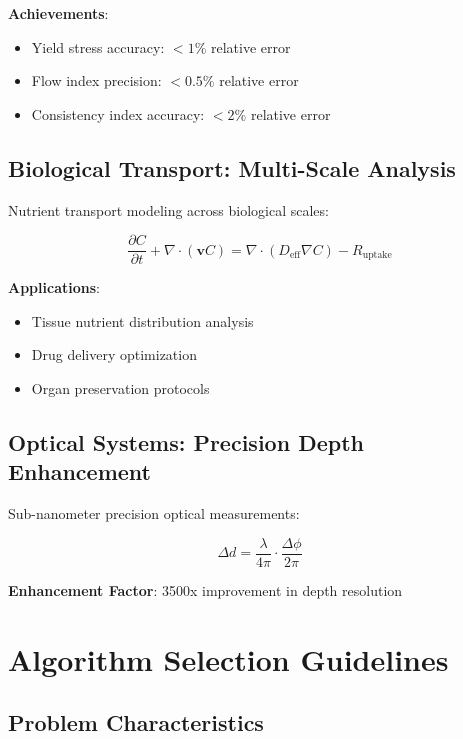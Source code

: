 \documentclass[11pt,a4paper]{article}
\begin{document}
\textbf{Achievements}:
\begin{itemize}
    \item Yield stress accuracy: $< 1\%$ relative error
    \item Flow index precision: $< 0.5\%$ relative error
    \item Consistency index accuracy: $< 2\%$ relative error
\end{itemize}

\subsection{Biological Transport: Multi-Scale Analysis}
\label{subsec:biological}

Nutrient transport modeling across biological scales:

\begin{equation}
\frac{\partial C}{\partial t} + \nabla \cdot (\mathbf{v}C) = \nabla \cdot (D_{\text{eff}} \nabla C) - R_{\text{uptake}}
\label{eq:advection_diffusion}
\end{equation}

\textbf{Applications}:
\begin{itemize}
    \item Tissue nutrient distribution analysis
    \item Drug delivery optimization
    \item Organ preservation protocols
\end{itemize}

\subsection{Optical Systems: Precision Depth Enhancement}
\label{subsec:optical}

Sub-nanometer precision optical measurements:

\begin{equation}
\Delta d = \frac{\lambda}{4\pi} \cdot \frac{\Delta \phi}{2\pi}
\label{eq:optical_precision}
\end{equation}

\textbf{Enhancement Factor}: 3500x improvement in depth resolution

\section{Algorithm Selection Guidelines}
\label{sec:algorithm_selection}

\subsection{Problem Characteristics}
\label{subsec:problem_characteristics}
\end{document}
